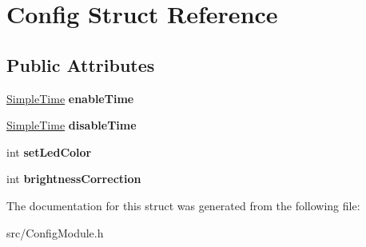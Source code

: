 \hypertarget{struct_config}{}\section{Config Struct Reference}
\label{struct_config}
\subsection*{Public Attributes}
\begin{DoxyCompactItemize}
\item 
\mbox{\label{struct_config_ab9e6019425ef494d061ef3d82e999b51}} 
\mbox{\hyperlink{class_simple_time}{Simple\+Time}} {\bfseries enable\+Time}
\item 
\mbox{\label{struct_config_ac16d52dba7a69c2675a7227d5e997f42}} 
\mbox{\hyperlink{class_simple_time}{Simple\+Time}} {\bfseries disable\+Time}
\item 
\mbox{\label{struct_config_afa51e4de07b10608a065b4d1966c579c}} 
int {\bfseries set\+Led\+Color}
\item 
\mbox{\label{struct_config_a436acc47264edf7e72102f48a15f6389}} 
int {\bfseries brightness\+Correction}
\end{DoxyCompactItemize}


The documentation for this struct was generated from the following file\+:\begin{DoxyCompactItemize}
\item 
src/Config\+Module.\+h\end{DoxyCompactItemize}
